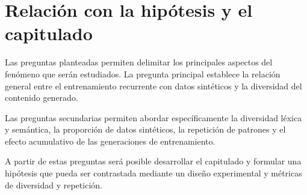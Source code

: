 \documentclass[12pt]{article}
\begin{document}
\section{Relación con la hipótesis y el capitulado}

Las preguntas planteadas permiten delimitar los principales aspectos
del fenómeno que serán estudiados. La pregunta principal establece la
relación general entre el entrenamiento recurrente con datos sintéticos
y la diversidad del contenido generado.

Las preguntas secundarias permiten abordar específicamente la
diversidad léxica y semántica, la proporción de datos sintéticos, la
repetición de patrones y el efecto acumulativo de las generaciones de
entrenamiento.

A partir de estas preguntas será posible desarrollar el capitulado y
formular una hipótesis que pueda ser contrastada mediante un diseño
experimental y métricas de diversidad y repetición.
\end{document}
